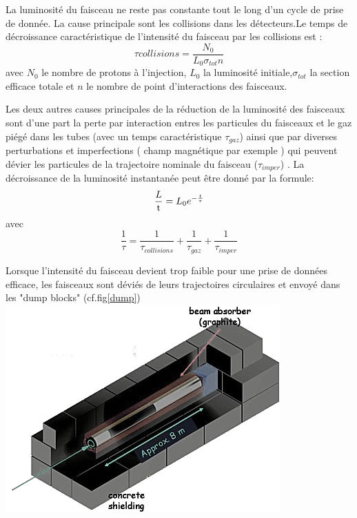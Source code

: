 La luminosité du faisceau ne reste pas constante tout le long d'un cycle de prise de donnée. La cause principale sont les collisions dans les détecteurs.Le temps de décroissance caractéristique de l'intensité du faisceau par les collisions est :
\begin{equation}
\tau{collisions}=\frac{N_{0}}{L_{0}\sigma_{tot}n}
\end{equation}
avec $N_{0}$ le nombre de protons à l'injection, $L_{0}$ la luminosité initiale,$\sigma_{tot}$ la section efficace totale et $n$ le nombre de point d'interactions des faisceaux.

Les deux autres causes principales de la réduction de la luminosité des faisceaux sont d'une part la perte par interaction entres les particules du faisceaux et le gaz piégé dans les tubes (avec un temps caractéristique $\tau_{gaz}$) ainsi que par diverses perturbations et imperfections ( champ magnétique par exemple ) qui peuvent dévier les particules de la trajectoire nominale du faisceau ($\tau_{imper}$) . 
La décroissance de la luminosité instantanée peut être donné par la formule:
\begin{equation}
\frac{\mathrm \mathcal{L}}{\mathrm t} = L_{0} e^{-\frac{t}{\tau}}
\end{equation}
avec
\begin{equation}
\frac{1}{\tau} = \frac{1}{\tau_{collisions}}+\frac{1}{\tau_{gaz}}+\frac{1}{\tau_{imper}}
\end{equation}

Lorsque l'intensité du faisceau devient trop faible pour une prise de données efficace, les faisceaux sont déviés de leurs trajectoires circulaires et envoyé dans les "dump blocks" (cf.fig\ref{dump})
\marginpar
{
	\includegraphics[width=\marginparwidth]{LHC/dump.png}
    	\label{dump}
}

